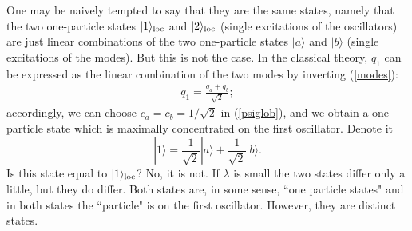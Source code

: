 \documentclass[10pt, nofootinbib]{revtex4}
\newcommand{\bea}{\begin{eqnarray}}
\newcommand{\eea}{\end{eqnarray}}
\begin{document}
One may be naively tempted to say that they are the same states,
namely that the two one-particle states $|1\rangle_{\rm loc}$ and
$|2\rangle_{\rm loc}$ (single excitations of the oscillators) are just
linear combinations of the two one-particle states $|a\rangle$ and
$|b\rangle$ (single excitations of the modes).  But this is not the
case.  In the classical theory, $q_{1}$ can be expressed
as the linear combination of the two modes by inverting (\ref{modes}):
%
\bea 
q_1 =\frac{q_{a}+q_{b}}{\sqrt{2}};
\eea
%
accordingly, we can choose $c_{a}=c_{b}=1/\sqrt{2}$ in
(\ref{psiglob}), and we obtain a one-particle state which is maximally
concentrated on the first oscillator. Denote it 
%
\begin{equation} 
|1\rangle= \frac{1}{\sqrt{2}} |a\rangle +
\frac{1}{\sqrt{2}} |b\rangle.
\label{1glo}
\end{equation}
%
Is this state equal to $|1\rangle_{\rm loc}$?  No, it is not.  If
$\lambda$ is small the two states differ only a little, but they do
differ.  Both states are, in some sense, ``one particle states" and in
both states the ``particle" is on the first oscillator.  However, they
are distinct states.  
\end{document}
